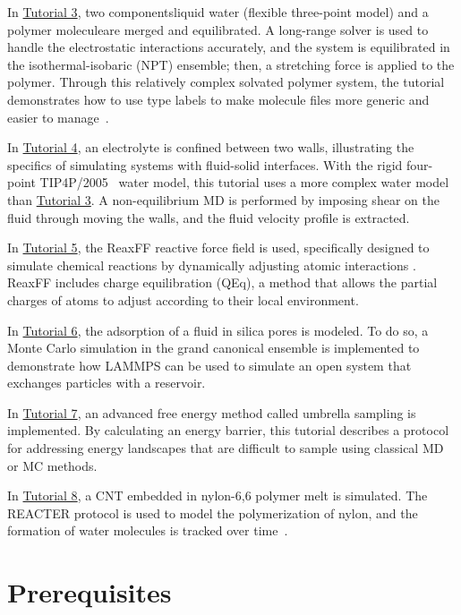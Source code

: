 \documentclass[9pt,tutorial]{livecoms}
\begin{document}
In \hyperref[all-atom-label]{Tutorial 3}, two components\textemdash liquid water
(flexible three-point model) and a polymer molecule\textemdash are merged and
equilibrated.  A long-range solver is used to handle the electrostatic
interactions accurately, and the system is equilibrated in the
isothermal-isobaric (NPT) ensemble; then, a stretching force is applied
to the polymer.  Through this relatively complex solvated polymer
system, the tutorial demonstrates how to use type labels to make
molecule files more generic and easier to manage~\cite{gissinger2024type}.

In \hyperref[sheared-confined-label]{Tutorial 4}, an electrolyte is
confined between two walls, illustrating the specifics of simulating
systems with fluid-solid interfaces.  With the rigid four-point
TIP4P/2005~\cite{abascal2005general} water model, this tutorial uses a
more complex water model than \hyperref[all-atom-label]{Tutorial 3}.  A
non-equilibrium MD is performed by imposing shear on the fluid through
moving the walls, and the fluid velocity profile is extracted.

In \hyperref[reactive-silicon-dioxide-label]{Tutorial 5}, the ReaxFF
reactive force field is used, specifically designed to simulate chemical
reactions by dynamically adjusting atomic interactions
\cite{van2001reaxff}.  ReaxFF includes charge equilibration (QEq), a
method that allows the partial charges of atoms to adjust according to
their local environment.

{\color{blue}In \hyperref[gcmc-silica-label]{Tutorial 6}, the adsorption of a fluid in
silica pores is modeled.  To do so,} a Monte Carlo simulation in
the grand canonical ensemble is implemented to demonstrate how LAMMPS
can be used to simulate an open system that exchanges particles with a
reservoir.

In \hyperref[umbrella-sampling-label]{Tutorial 7}, an advanced free
energy method called umbrella sampling is implemented.  By calculating
an energy barrier, this tutorial describes a protocol
for addressing energy landscapes that are difficult to sample using
classical MD or MC methods.

In \hyperref[bond-react-label]{Tutorial 8}, a CNT embedded in
nylon-6,6 polymer melt is simulated.  The
REACTER protocol is used to model the polymerization of nylon, and the formation
of water molecules is tracked over time~\cite{gissinger2020reacter}.

\section{Prerequisites}
\end{document}
